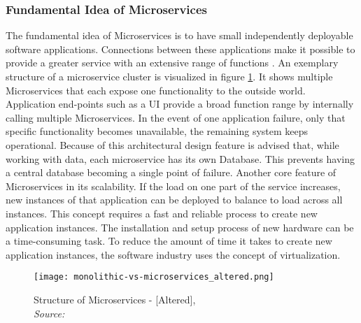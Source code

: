 \documentclass[12pt, a4paper]{article}
\begin{document}
        \subsubsection{Fundamental Idea of Microservices}
        The fundamental idea of Microservices is to have small independently deployable software applications. Connections between these applications make it possible to provide a greater service with an extensive range of functions \cite{micro}. An exemplary structure of a microservice cluster is visualized in figure \ref{fig::micro}. It shows multiple Microservices that each expose one functionality to the outside world. Application end-points such as a \ac{UI} provide a broad function range by internally calling multiple Microservices. In the event of one application failure, only that specific functionality becomes unavailable, the remaining system keeps operational. Because of this architectural design feature is advised that, while working with data, each microservice has its own Database. This prevents having a central database becoming a single point of failure. Another core feature of Microservices in its scalability. If the load on one part of the service increases, new instances of that application can be deployed to balance to load across all instances. This concept requires a fast and reliable process to create new application instances.\newline
        The installation and setup process of new hardware can be a time-consuming task. To reduce the amount of time it takes to create new application instances, the software industry uses the concept of virtualization.

        \begin{figure}
            \centering
            \texttt{[image: monolithic-vs-microservices\_altered.png]}
            \caption{Structure of Microservices - [Altered], \\\textit{Source:~\cite{redhat_micro}}}\label{fig::micro}
        \end{figure}
\end{document}
